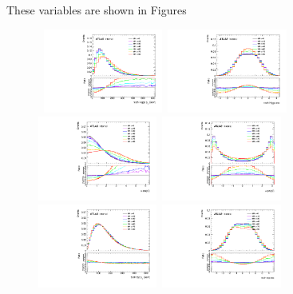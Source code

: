 These variables are shown in Figures


\begin{figure}[!ht] 
  \begin{center}
    \mbox{ 
      \includegraphics[width=0.35\textwidth]{figures/tthcp_chapter/observables/ttH/c_H_pt.pdf}
      \includegraphics[width=0.35\textwidth]{figures/tthcp_chapter/observables/ttH/c_H_eta.pdf}
    }
    \mbox{ 
      \includegraphics[width=0.35\textwidth]{figures/tthcp_chapter/observables/ttH/c_delta_eta_tt.pdf}
      \includegraphics[width=0.35\textwidth]{figures/tthcp_chapter/observables/ttH/c_delta_phi_tt.pdf}
    }
    \mbox{ 
      \includegraphics[width=0.35\textwidth]{figures/tthcp_chapter/observables/ttH/c_t_pt.pdf}
      \includegraphics[width=0.35\textwidth]{figures/tthcp_chapter/observables/ttH/c_t_eta.pdf}
}
\end{center}
\end{figure}

